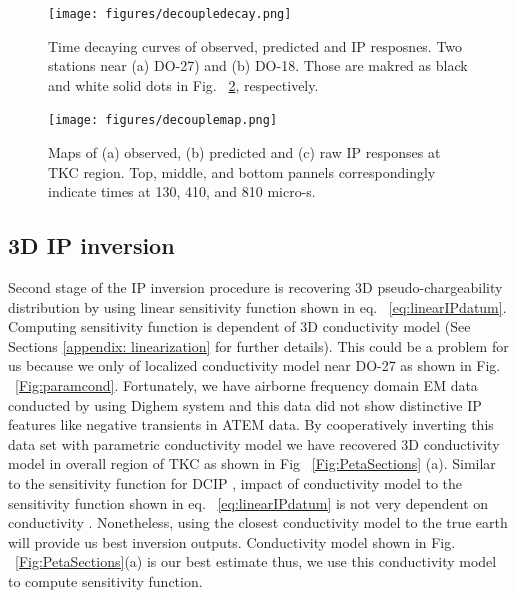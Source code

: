 \documentclass[letterpaper,11pt]{article}
\begin{document}
\begin{figure}[htb]
  \centering
  \texttt{[image: figures/decoupledecay.png]}
  \caption{Time decaying curves of observed, predicted and IP resposnes. Two stations near (a) DO-27) and (b) DO-18. Those are makred as black and white solid dots in Fig. ~\ref{Fig:decouplemap}, respectively.}
  \label{Fig:decoupledecay}
\end{figure}

\begin{figure}[htb]
  \centering
  \texttt{[image: figures/decouplemap.png]}
  \caption{Maps of (a) observed, (b) predicted and (c) raw IP responses at TKC region. Top, middle, and bottom pannels correspondingly indicate times at 130, 410, and 810 micro-s. }
  \label{Fig:decouplemap}
\end{figure}

\subsection{3D IP inversion}
Second stage of the IP inversion procedure is recovering 3D pseudo-chargeability distribution by using linear sensitivity function shown in eq. ~\ref{eq:linearIPdatum}. Computing sensitivity function is dependent of 3D conductivity model (See Sections \ref{appendix: linearization} for further details). This could be a problem for us because we only of localized conductivity model near DO-27 as shown in Fig. ~\ref{Fig:paramcond}. Fortunately, we have airborne frequency domain EM data conducted by using Dighem system and this data did not show distinctive IP features like negative transients in ATEM data. By cooperatively inverting this data set with parametric conductivity model we have recovered 3D conductivity model in overall region of TKC as shown in Fig ~\ref{Fig:PetaSections} (a). Similar to the sensitivity function for DCIP \cite[]{doug1994}, impact of conductivity model to the sensitivity function shown in eq. ~\ref{eq:linearIPdatum} is not very dependent on conductivity \cite[]{Kang2015c}. Nonetheless, using the closest conductivity model to the true earth will provide us best inversion outputs. Conductivity model shown in Fig. ~\ref{Fig:PetaSections}(a) is our best estimate thus, we use this conductivity model to compute sensitivity function. 
\end{document}
